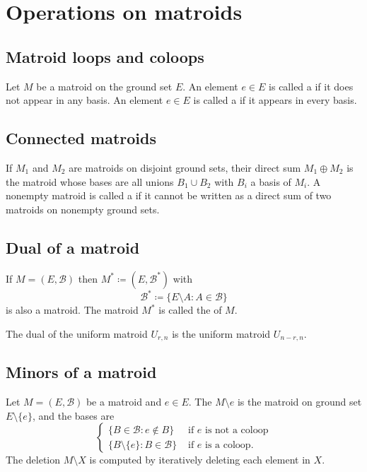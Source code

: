 \section[matroidOperations]{Operations on matroids}


\subsection[matroidLoopsColoops]{Matroid loops and coloops}

Let $M$ be a matroid on the ground set $E$.
An element $e \in E$ is called a \label{matroidLoop} if it does
not appear in any basis.
An element $e \in E$ is called a \label{matroidColoop} if it
appears in every basis.


\subsection[connectedMatroid]{Connected matroids}

If $M_1$ and $M_2$ are matroids on disjoint ground sets, their direct sum
$M_1\oplus M_2$ is the matroid whose bases are all unions $B_1\cup B_2$ with
$B_i$ a basis of $M_i$.  A nonempty matroid is called a
 if it cannot be written as a direct sum of two
matroids on nonempty ground sets.


\subsection[matroidDuality]{Dual of a matroid}

If $M=(E,\mathcal{B})$ then $M^* \coloneqq (E,\mathcal{B}^*)$
with
\[
\mathcal{B}^* \coloneqq \{E \setminus A : A \in \mathcal{B}\}
\]
is also a matroid.  The matroid $M^*$ is called the
\label{matroidDual} of $M$.

The dual of the uniform matroid $U_{r,n}$ is the uniform matroid $U_{n-r,n}$.



\subsection[matroidMinors]{Minors of a matroid}

Let $M=(E,\mathcal{B})$ be a matroid and $e \in E$.
The \label{matroidDeletion} $M \setminus e$
is the matroid on ground set $E\setminus \{e\}$,
and the bases are
\[
\begin{cases}
\{ B \in \mathcal{B} : e \notin B \} & \text{ if $e$ is not a coloop} \\
\{ B \setminus \{e\} : B \in \mathcal{B}  \} & \text{ if $e$ is a coloop}.
\end{cases}
\]
The deletion $M \setminus X$ is computed by iteratively deleting each element in $X$.

